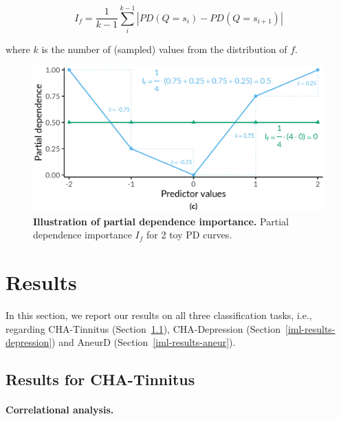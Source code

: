 \documentclass[
  oneside]{book}
\begin{document}
\begin{equation}
I_f = \frac{1}{k-1}\sum_{i}^{k-1} |PD(Q=s_i) - PD(Q=s_{i+1})|
\label{eq:pdp-imp}
\end{equation}

where \(k\) is the number of (sampled) values from the distribution of \(f\).



\begin{figure}[h]

{\centering \includegraphics[width=0.64\linewidth]{figures/09-pd-intro-2} 

}

\caption{\textbf{Illustration of partial dependence importance.} Partial dependence importance \(I_f\) for 2 toy PD curves.}\label{fig:09-pd-intro-2}
\end{figure}

\hypertarget{iml-results}{%
\section{Results}\label{iml-results}}

In this section, we report our results on all three classification tasks, i.e., regarding CHA-Tinnitus (Section~\ref{iml-results-tinnitus}),
CHA-Depression (Section~\ref{iml-results-depression}) and
AneurD (Section~\ref{iml-results-aneur}).

\hypertarget{iml-results-tinnitus}{%
\subsection{Results for CHA-Tinnitus}\label{iml-results-tinnitus}}

\paragraph*{Correlational analysis.}
\end{document}
